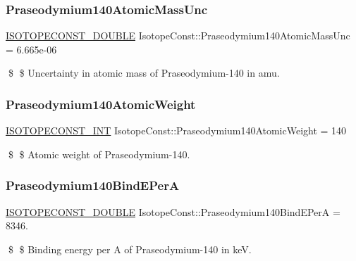 \subsubsection{\texorpdfstring{Praseodymium140\+Atomic\+Mass\+Unc}{Praseodymium140AtomicMassUnc}}
{\footnotesize\ttfamily \mbox{\hyperlink{group___isotope_const-_macros_ga8f45a7272ce02c0b4c65c44636ed719a}{I\+S\+O\+T\+O\+P\+E\+C\+O\+N\+S\+T\+\_\+\+D\+O\+U\+B\+LE}} Isotope\+Const\+::\+Praseodymium140\+Atomic\+Mass\+Unc = 6.\+665e-\/06}

\$ \$ Uncertainty in atomic mass of Praseodymium-\/140 in amu. \mbox{\label{group___isotope_const-_praseodymium-_pr140_ga8756c32ff18c472c918cc96ddd64e8f1}} 
\subsubsection{\texorpdfstring{Praseodymium140\+Atomic\+Weight}{Praseodymium140AtomicWeight}}
{\footnotesize\ttfamily \mbox{\hyperlink{group___isotope_const-_macros_ga5f18360b3e99483a35c32d789e62621c}{I\+S\+O\+T\+O\+P\+E\+C\+O\+N\+S\+T\+\_\+\+I\+NT}} Isotope\+Const\+::\+Praseodymium140\+Atomic\+Weight = 140}

\$ \$ Atomic weight of Praseodymium-\/140. \mbox{\label{group___isotope_const-_praseodymium-_pr140_ga023408a7ff8e600a281ffd5a57dae783}} 
\subsubsection{\texorpdfstring{Praseodymium140\+Bind\+E\+PerA}{Praseodymium140BindEPerA}}
{\footnotesize\ttfamily \mbox{\hyperlink{group___isotope_const-_macros_ga8f45a7272ce02c0b4c65c44636ed719a}{I\+S\+O\+T\+O\+P\+E\+C\+O\+N\+S\+T\+\_\+\+D\+O\+U\+B\+LE}} Isotope\+Const\+::\+Praseodymium140\+Bind\+E\+PerA = 8346.}

\$ \$ Binding energy per A of Praseodymium-\/140 in keV. \mbox{\label{group___isotope_const-_praseodymium-_pr140_ga530c7b4c7300572fe935dcfba7d1d534}} 
